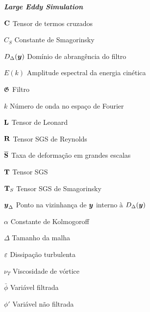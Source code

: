 \begin{simbolos}
  \item[\textbf{\textit{Large Eddy Simulation}}]
  \item[$\mathbf{C}$] Tensor de termos cruzados
  \item[$C_S$] Constante de Smagorinsky
  \item[$D_\Delta(\boldsymbol{y})$] Domínio de abrangência do filtro
  \item[$E(k)$] Amplitude espectral da energia cinética
  \item[$\mathfrak{G}$] Filtro
  \item[$k$] Número de onda no espaço de Fourier
  \item[$\mathbf{L}$] Tensor de Leonard
  \item[$\mathbf{R}$] Tensor SGS de Reynolds
  \item[$\overline{\mathbf{S}}$] Taxa de deformação em grandes escalas
  \item[$\mathbf{T}$] Tensor SGS
  \item[$\mathbf{T}_S$] Tensor SGS de Smagorinsky
  \item[$\boldsymbol{y}_\Delta$] Ponto na vizinhança de $\boldsymbol{y}$ interno à $D_\Delta(\boldsymbol{y})$
  \item[$\alpha$] Constante de Kolmogoroff
  \item[$\Delta$] Tamanho da malha
  \item[$\varepsilon$] Dissipação turbulenta
  \item[$\nu_T$] Viscosidade de vórtice
  \item[$\bar{\phi}$] Variável filtrada
  \item[$\phi'$] Variável não filtrada

  \begin{comment}
  \item[\textbf{\textit{Reynolds-Averaged Navier-Stokes}}]
  \item[$\BB{b}$] Tensor de tensões anisotrópico de Reynolds
  \item[$\BB{C}$] Gradiente de difusão turbulenta
  \item[$D_\ep$] Difusão turbulenta
  \item[$k$] Energia cinética média gerada pelo campo de flutuações
  \item[$\script{P}$] Pressão dividida pela massa específica
  \item[$\BB{P}$] Produção do tensor de Reynolds
  \item[$P_\ep$] Produção da dissipação
  \item[$\ep$] Dissipação turbulenta da energia cinética
  \item[$\BB{\ep}$] Tensor de taxa de dissipação turbulenta da energia cinética
  \item[$\BB{\Pi}$] Correlação entre pressão e o tensor de taxa de deformação do campo de flutuações
  \item[$\bar{\phi}$] Média temporal de uma propriedade
  \item[$\phi'$] Flutuação de uma propriedade no espaço-tempo
  \item[$\Phi_\ep$] Destruição turbulenta da dissipação
  \item[$\BB{\tau}$] Tensor de tensões de Reynolds
  \item[$\omega$] Escala de tempo turbulento
  \end{comment}
\end{simbolos}